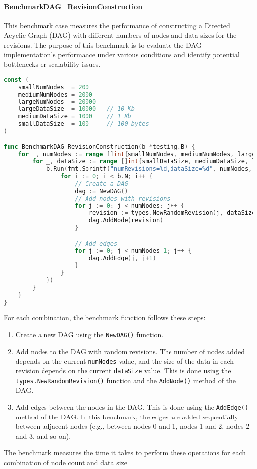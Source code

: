 \paragraph{BenchmarkDAG\_RevisionConstruction}
This benchmark case measures the performance of constructing a Directed Acyclic Graph (DAG) with different numbers of nodes and data sizes for the revisions. The purpose of this benchmark is to evaluate the DAG implementation's performance under various conditions and identify potential bottlenecks or scalability issues.

\begin{lstlisting}[language=go]
const (
	smallNumNodes  = 200
	mediumNumNodes = 2000
	largeNumNodes  = 20000
	largeDataSize  = 10000   // 10 Kb
	mediumDataSize = 1000    // 1 Kb
	smallDataSize  = 100     // 100 bytes
)

func BenchmarkDAG_RevisionConstruction(b *testing.B) {
	for _, numNodes := range []int{smallNumNodes, mediumNumNodes, largeNumNodes} {
		for _, dataSize := range []int{smallDataSize, mediumDataSize, largeDataSize} {
			b.Run(fmt.Sprintf("numRevisions=%d,dataSize=%d", numNodes, dataSize), func(b *testing.B) {
				for i := 0; i < b.N; i++ {
					// Create a DAG
					dag := NewDAG()
					// Add nodes with revisions
					for j := 0; j < numNodes; j++ {
						revision := types.NewRandomRevision(j, dataSize)
						dag.AddNode(revision)
					}

					// Add edges
					for j := 0; j < numNodes-1; j++ {
						dag.AddEdge(j, j+1)
					}
				}
			})
		}
	}
}
\end{lstlisting}
\medskip

For each combination, the benchmark function follows these steps:
\begin{enumerate}
	\item Create a new DAG using the \lstinline{NewDAG()} function.
	\item Add nodes to the DAG with random revisions. The number of nodes added depends on the current \lstinline{numNodes} value, and the size of the data in each revision depends on the current \lstinline{dataSize} value. This is done using the \lstinline{types.NewRandomRevision()} function and the \lstinline{AddNode()} method of the DAG.
	\item Add edges between the nodes in the DAG. This is done using the \lstinline{AddEdge()} method of the DAG. In this benchmark, the edges are added sequentially between adjacent nodes (e.g., between nodes 0 and 1, nodes 1 and 2, nodes 2 and 3, and so on).
\end{enumerate}
The benchmark measures the time it takes to perform these operations for each combination of node count and data size.

